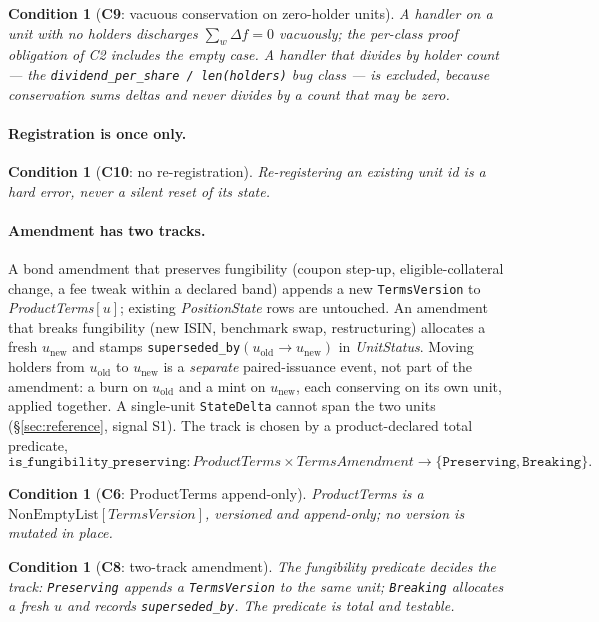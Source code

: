 \documentclass[11pt,a4paper]{article}
\newtheorem{condition}[definition]{Condition}
\begin{document}
\begin{condition}[\textbf{C9}: vacuous conservation on zero-holder units]
A handler on a unit with no holders discharges $\sum_w\Delta f=0$ vacuously; the per-class
proof obligation of C2 includes the empty case. A handler that divides by holder count ---
the \texttt{dividend\_per\_share / len(holders)} bug class --- is excluded, because
conservation sums deltas and never divides by a count that may be zero.
\end{condition}

\paragraph{Registration is once only.}
\begin{condition}[\textbf{C10}: no re-registration]
Re-registering an existing unit id is a hard error, never a silent reset of its state.
\end{condition}

\paragraph{Amendment has two tracks.}
A bond amendment that preserves fungibility (coupon step-up, eligible-collateral change, a
fee tweak within a declared band) appends a new \texttt{TermsVersion} to
\emph{ProductTerms}$[u]$; existing \emph{PositionState} rows are untouched. An amendment that
breaks fungibility (new ISIN, benchmark swap, restructuring) allocates a fresh
$u_{\mathrm{new}}$ and stamps \texttt{superseded\_by}$(u_{\mathrm{old}}\to u_{\mathrm{new}})$
in \emph{UnitStatus}. Moving holders from $u_{\mathrm{old}}$ to $u_{\mathrm{new}}$ is a
\emph{separate} paired-issuance event, not part of the amendment: a burn on $u_{\mathrm{old}}$
and a mint on $u_{\mathrm{new}}$, each conserving on its own unit, applied together. A
single-unit \texttt{StateDelta} cannot span the two units (\S\ref{sec:reference}, signal S1).
The track is chosen by a product-declared total predicate,
\[
\texttt{is\_fungibility\_preserving} : \mathit{ProductTerms}\times\mathit{TermsAmendment}
\to \{\texttt{Preserving},\texttt{Breaking}\}.
\]

\begin{condition}[\textbf{C6}: ProductTerms append-only]
\emph{ProductTerms} is a $\mathrm{NonEmptyList}[\mathit{TermsVersion}]$, versioned and
append-only; no version is mutated in place.
\end{condition}

\begin{condition}[\textbf{C8}: two-track amendment]
The fungibility predicate decides the track: \texttt{Preserving} appends a
\texttt{TermsVersion} to the same unit; \texttt{Breaking} allocates a fresh $u$ and records
\texttt{superseded\_by}. The predicate is total and testable.
\end{condition}
\end{document}

